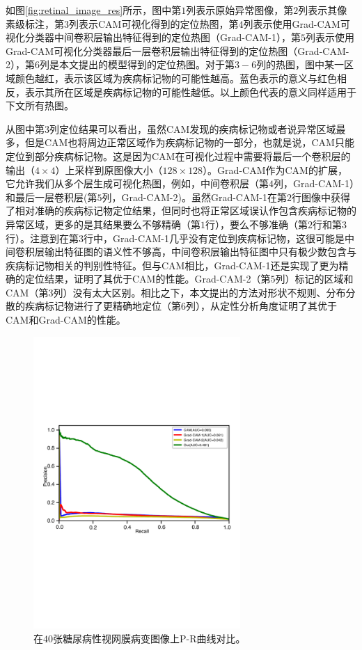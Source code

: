 如图\ref{fig:retinal_image_res}所示，图中第$1$列表示原始异常图像，第$2$列表示其像素级标注，第$3$列表示CAM可视化得到的定位热图，第$4$列表示使用Grad-CAM可视化分类器中间卷积层输出特征得到的定位热图（Grad-CAM-1），第$5$列表示使用Grad-CAM可视化分类器最后一层卷积层输出特征得到的定位热图（Grad-CAM-2），第$6$列是本文提出的模型得到的定位热图。对于第$3-6$列的热图，图中某一区域颜色越红，表示该区域为疾病标记物的可能性越高。蓝色表示的意义与红色相反，表示其所在区域是疾病标记物的可能性越低。以上颜色代表的意义同样适用于下文所有热图。

从图中第$3$列定位结果可以看出，虽然CAM发现的疾病标记物或者说异常区域最多，但是CAM也将周边正常区域作为疾病标记物的一部分，也就是说，CAM只能定位到部分疾病标记物。这是因为CAM在可视化过程中需要将最后一个卷积层的输出（$4\times 4$）上采样到原图像大小（$128\times 128$）。Grad-CAM作为CAM的扩展，它允许我们从多个层生成可视化热图，例如，中间卷积层（第$4$列，Grad-CAM-1）和最后一层卷积层(第$5$列，Grad-CAM-2)。虽然Grad-CAM-1在第$2$行图像中获得了相对准确的疾病标记物定位结果，但同时也将正常区域误认作包含疾病标记物的异常区域，更多的是其结果要么不够精确（第$1$行），要么不够准确（第$2$行和第$3$行）。注意到在第$3$行中，Grad-CAM-1几乎没有定位到疾病标记物，这很可能是中间卷积层输出特征图的语义性不够高，中间卷积层输出特征图中只有极少数包含与疾病标记物相关的判别性特征。但与CAM相比，Grad-CAM-1还是实现了更为精确的定位结果，证明了其优于CAM的性能。Grad-CAM-2（第$5$列）标记的区域和CAM（第$3$列）没有太大区别。相比之下，本文提出的方法对形状不规则、分布分散的疾病标记物进行了更精确地定位（第$6$列），从定性分析角度证明了其优于CAM和Grad-CAM的性能。
\begin{figure}[h!]
	\centering
	\includegraphics[width=0.7\textwidth]{figure/pr_curve_retinal_image/pr_curve}
	\caption[在$40$张糖尿病性视网膜病变图像上P-R曲线对比]{在$40$张糖尿病性视网膜病变图像上P-R曲线对比。}
	\label{fig:retinal_image_pr_curve}
\end{figure}


